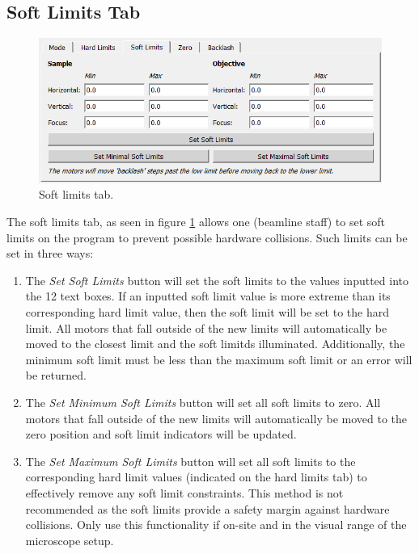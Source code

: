 \documentclass[a4paper, 12pt]{report}
\begin{document}
    
    \subsection{Soft Limits Tab}
    \begin{figure}[h]
        \centering
        \includegraphics{figures/soft_limits_tab.png}
        \caption{Soft limits tab.}
        \label{fig:7}
    \end{figure}

    The soft limits tab, as seen in figure \ref{fig:7} allows one (beamline staff) to set soft limits on the program to prevent possible hardware collisions. Such limits can be set in three ways:
    
    \begin{enumerate}
        \item The \textit{Set Soft Limits} button will set the soft limits to the values inputted into the 12 text boxes. If an inputted soft limit value is more extreme than its corresponding hard limit value, then the soft limit will be set to the hard limit. All motors that fall outside of the new limits will automatically be moved to the closest limit and the soft limitds illuminated. Additionally, the minimum soft limit must be less than the maximum soft limit or an error will be returned.
        \item The \textit{Set Minimum Soft Limits} button will set all soft limits to zero. All motors that fall outside of the new limits will automatically be moved to the zero position and soft limit indicators will be updated.
        \item The \textit{Set Maximum Soft Limits} button will set all soft limits to the corresponding hard limit values (indicated on the hard limits tab) to effectively remove any soft limit constraints. This method is not recommended as the soft limits provide a safety margin against hardware collisions. Only use this functionality if on-site and in the visual range of the microscope setup.
    \end{enumerate}
    
\end{document}
